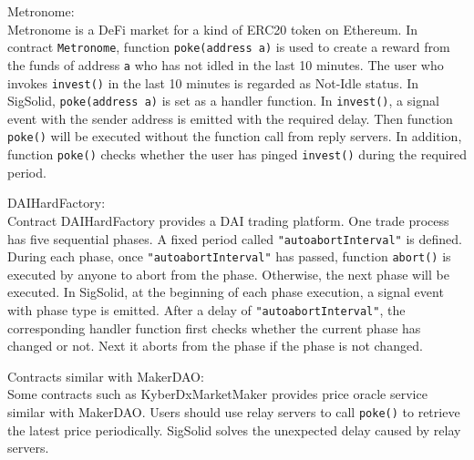 \documentclass{article}
\newcommand{\sourcecode}[1]{\texttt{#1}}
\begin{document}
Metronome:\\
Metronome is a DeFi market for a kind of ERC20 token on Ethereum.
In contract \sourcecode{Metronome}, 
function \sourcecode{poke(address a)} is used to create a reward from the funds of address \sourcecode{a} 
who has not idled in the last 10 minutes. 
The user who invokes \sourcecode{invest()} in the last 10 minutes is regarded as Not-Idle status.
In SigSolid, \sourcecode{poke(address a)} is set as a handler function.
In \sourcecode{invest()}, a signal event with the sender address is emitted with the required delay.
Then function \sourcecode{poke()} will be executed without the function call from reply servers.
In addition, function \sourcecode{poke()} checks 
whether the user has pinged \sourcecode{invest()} during the required period.

DAIHardFactory:\\
Contract DAIHardFactory provides a DAI trading platform. One trade process has five sequential phases. A fixed period called \sourcecode{"autoabortInterval"} is defined. 
During each phase, once \sourcecode{"autoabortInterval"} has passed, function \sourcecode{abort()}
is executed by anyone to abort from the phase. Otherwise, the next phase will be executed.
In SigSolid, at the beginning of each phase execution, 
a signal event with phase type is emitted. 
After a delay of \sourcecode{"autoabortInterval"},
the corresponding handler function first checks whether the current phase has changed or not.
Next it aborts from the phase if the phase is not changed.

Contracts similar with MakerDAO:\\
Some contracts such as KyberDxMarketMaker provides price oracle service similar with MakerDAO.
Users should use relay servers to call \sourcecode{poke()} to retrieve the latest price periodically. 
SigSolid solves the unexpected delay caused by relay servers.
\end{document}
